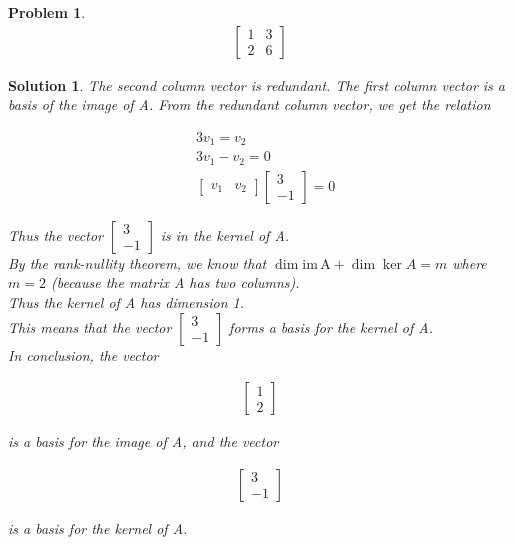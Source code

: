 \documentclass{article}
\newtheorem{problem}{Problem}
\newtheorem*{solution}{Solution}
\newcommand{\im}[1]{\mathrm{im \, #1}}
\begin{document}
\begin{problem}
\begin{align*}
\begin{bmatrix}
1 & 3 \\ 2 & 6
\end{bmatrix}
\end{align*}
\end{problem}

\begin{solution}
The second column vector is redundant. The first column vector is a basis of the image of A. From the redundant column vector, we get the relation

\begin{align*}
& 3v_{1} = v_{2} \\
& 3v_{1} - v_{2} = 0 \\
& \begin{bmatrix} v_{1} & v_{2} \end{bmatrix} \begin{bmatrix} 3 \\ -1 \end{bmatrix} = 0
\end{align*}

Thus the vector $\begin{bmatrix} 3 \\ -1 \end{bmatrix}$ is in the kernel of A. \\

By the rank-nullity theorem, we know that $\dim \im A + \dim \ker A = m$ where $m = 2$ (because the matrix A has two columns). \\ 

Thus the kernel of A has dimension 1. \\

This means that the vector $\begin{bmatrix} 3 \\ -1 \end{bmatrix}$ forms a basis for the kernel of A. \\

In conclusion, the vector

\begin{align*}
\begin{bmatrix} 1 \\ 2 \end{bmatrix}
\end{align*}

is a basis for the image of A, and the vector

\begin{align*}
\begin{bmatrix} 3 \\ -1 \end{bmatrix}
\end{align*}

is a basis for the kernel of A.

\end{solution}
\end{document}
